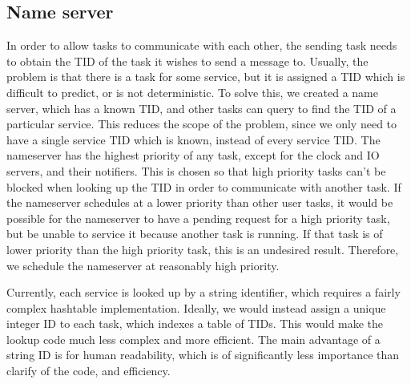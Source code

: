 \documentclass[titlepage]{article}
\begin{document}
\subsection{Name server}
In order to allow tasks to communicate with each other, the sending task needs to
obtain the TID of the task it wishes to send a message to.
Usually, the problem is that there is a task for some service, but it is assigned
a TID which is difficult to predict, or is not deterministic.
To solve this, we created a name server, which has a known TID, and other tasks
can query to find the TID of a particular service.
This reduces the scope of the problem, since we only need to have a single service
TID which is known, instead of every service TID\@.
The nameserver has the highest priority of any task, except for the clock and IO
servers, and their notifiers.
This is chosen so that high priority tasks can't be blocked when looking up the TID
in order to communicate with another task.
If the nameserver schedules at a lower priority than other user tasks, it would be possible
for the nameserver to have a pending request for a high priority task, but be unable
to service it because another task is running.
If that task is of lower priority than the high priority task, this is an undesired
result.
Therefore, we schedule the nameserver at reasonably high priority.

Currently, each service is looked up by a string identifier, which requires a fairly
complex hashtable implementation.
Ideally, we would instead assign a unique integer ID to each task, which indexes
a table of TIDs.
This would make the lookup code much less complex and more efficient.
The main advantage of a string ID is for human readability, which is of significantly
less importance than clarify of the code, and efficiency.
\end{document}
